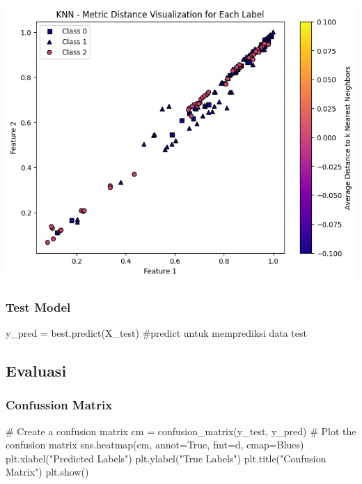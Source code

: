 \documentclass[
  letterpaper,
  DIV=11,
  numbers=noendperiod]{scrreprt}
\newenvironment{Shaded}{\begin{snugshade}}{\end{snugshade}}
\newcommand{\CommentTok}[1]{\textcolor[rgb]{0.37,0.37,0.37}{#1}}
\newcommand{\NormalTok}[1]{\textcolor[rgb]{0.00,0.23,0.31}{#1}}
\newcommand{\OperatorTok}[1]{\textcolor[rgb]{0.37,0.37,0.37}{#1}}
\newcommand{\StringTok}[1]{\textcolor[rgb]{0.13,0.47,0.30}{#1}}
\newcommand{\VariableTok}[1]{\textcolor[rgb]{0.07,0.07,0.07}{#1}}
\begin{document}
\includegraphics{Asset/plt_knndistance_optimasi.png}

\hypertarget{test-model-1}{%
\subsubsection*{Test Model}\label{test-model-1}}

\begin{Shaded}
\begin{Highlighting}[]
\NormalTok{y\_pred }\OperatorTok{=}\NormalTok{ best.predict(X\_test) }\CommentTok{\#predict untuk memprediksi data test}
\end{Highlighting}
\end{Shaded}

\hypertarget{evaluasi-2}{%
\subsection*{Evaluasi}\label{evaluasi-2}}

\hypertarget{confussion-matrix-1}{%
\subsubsection*{Confussion Matrix}\label{confussion-matrix-1}}

\begin{Shaded}
\begin{Highlighting}[]
\CommentTok{\# Create a confusion matrix}
\NormalTok{cm }\OperatorTok{=}\NormalTok{ confusion\_matrix(y\_test, y\_pred)}
\CommentTok{\# Plot the confusion matrix}
\NormalTok{sns.heatmap(cm, annot}\OperatorTok{=}\VariableTok{True}\NormalTok{, fmt}\OperatorTok{=}\StringTok{\textquotesingle{}d\textquotesingle{}}\NormalTok{, cmap}\OperatorTok{=}\StringTok{\textquotesingle{}Blues\textquotesingle{}}\NormalTok{)}
\NormalTok{plt.xlabel(}\StringTok{"Predicted Labels"}\NormalTok{)}
\NormalTok{plt.ylabel(}\StringTok{"True Labels"}\NormalTok{)}
\NormalTok{plt.title(}\StringTok{"Confusion Matrix"}\NormalTok{)}
\NormalTok{plt.show()}
\end{Highlighting}
\end{Shaded}
\end{document}
